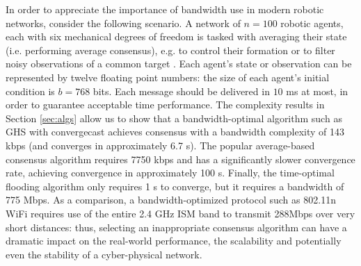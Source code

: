 \documentclass[letterpaper,10pt,conference]{ieeeconf}
\begin{document}
In order to appreciate the importance of bandwidth use in modern robotic networks, consider the following scenario. A network of $n=100$ robotic agents, each with six mechanical degrees of freedom is tasked with averaging their state (i.e. performing average consensus), e.g. to control their formation \cite{WR-RWB-EMA:07} or to filter noisy observations of a common target \cite{ROS:07}. Each agent's state or observation can be represented by twelve floating point numbers:  the size of each agent's initial condition is $b=768$ bits. Each message should be delivered in $10$ ms at most, in order to guarantee acceptable time performance. The complexity results in Section \ref{sec:algs} allow us to show that a bandwidth-optimal algorithm such as GHS with convergecast achieves consensus with a bandwidth complexity of 143 kbps (and converges in approximately 6.7 s). The popular average-based consensus algorithm requires 7750 kbps and has a significantly slower convergence rate, achieving convergence in approximately 100 s. Finally, the time-optimal flooding algorithm only requires 1 s to converge, but it requires a bandwidth of 775 Mbps.
As a comparison, a bandwidth-optimized protocol such as 802.11n WiFi requires use of the entire 2.4 GHz ISM band to transmit 288Mbps over very short distances: thus, selecting an inappropriate consensus algorithm can have a dramatic impact on the real-world performance, the scalability and potentially even the stability of a cyber-physical network. 
\end{document}
